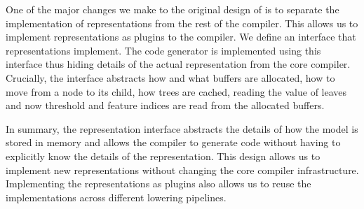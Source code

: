 One of the major changes we make to the original design of \TreebeardOLD{} \cite{Treebeard} is to
separate the implementation of representations from the rest of the compiler. This allows
us to implement representations as plugins to the compiler. We define an interface 
that representations implement. The code generator is implemented using
this interface thus hiding details of the actual representation from the core 
compiler. Crucially, the interface abstracts how and what buffers 
are allocated, how to move from a node to its child, how trees 
are cached, reading the value of leaves and now threshold and 
feature indices are read from the allocated buffers.

In summary, the representation interface abstracts the details of how the model is stored in memory
and allows the compiler to generate code without having to explicitly know the details of the
representation. This design allows us to implement new representations without changing the core
compiler infrastructure. Implementing the representations as plugins also allows us to reuse
the implementations across different lowering pipelines. 

